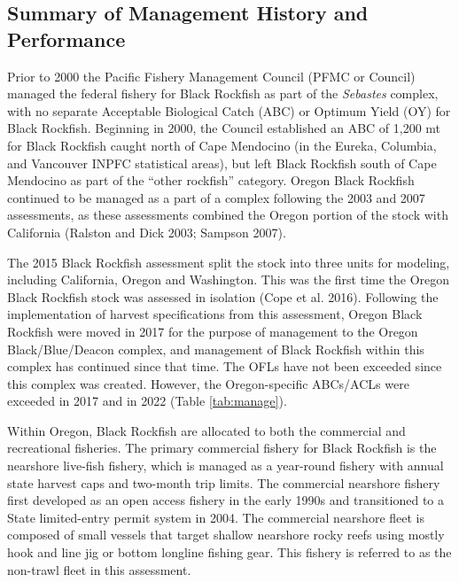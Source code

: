 \documentclass[11pt,
  letterpaper,
]{article}
\begin{document}
\hypertarget{summary-of-management-history-and-performance}{%
\subsection{Summary of Management History and Performance}\label{summary-of-management-history-and-performance}}

Prior to 2000 the Pacific Fishery Management Council (PFMC or Council) managed the federal fishery for Black Rockfish as part of the \emph{Sebastes} complex, with no separate Acceptable Biological Catch (ABC) or Optimum Yield (OY) for Black Rockfish. Beginning in 2000, the Council established an ABC of 1,200 mt for Black Rockfish caught north of Cape Mendocino (in the Eureka, Columbia, and Vancouver INPFC statistical areas), but left Black Rockfish south of Cape Mendocino as part of the ``other rockfish'' category. Oregon Black Rockfish continued to be managed as a part of a complex following the 2003 and 2007 assessments, as these assessments combined the Oregon portion of the stock with California (Ralston and Dick 2003; Sampson 2007).

The 2015 Black Rockfish assessment split the stock into three units for modeling, including California, Oregon and Washington. This was the first time the Oregon Black Rockfish stock was assessed in isolation (Cope et al. 2016). Following the implementation of harvest specifications from this assessment, Oregon Black Rockfish were moved in 2017 for the purpose of management to the Oregon Black/Blue/Deacon complex, and management of Black Rockfish within this complex has continued since that time. The OFLs have not been exceeded since this complex was created. However, the Oregon-specific ABCs/ACLs were exceeded in 2017 and in 2022 (Table \ref{tab:manage}).

Within Oregon, Black Rockfish are allocated to both the commercial and recreational fisheries. The primary commercial fishery for Black Rockfish is the nearshore live-fish fishery, which is managed as a year-round fishery with annual state harvest caps and two-month trip limits. The commercial nearshore fishery first developed as an open access fishery in the early 1990s and transitioned to a State limited-entry permit system in 2004. The commercial nearshore fleet is composed of small vessels that target shallow nearshore rocky reefs using mostly hook and line jig or bottom longline fishing gear. This fishery is referred to as the non-trawl fleet in this assessment.
\end{document}
